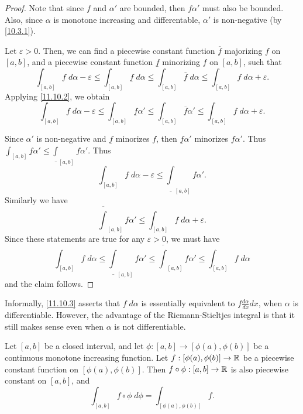 \begin{proof}
  Note that since \(f\) and \(\alpha'\) are bounded, then \(f \alpha'\) must also be bounded.
  Also, since \(\alpha\) is monotone increasing and differentable, \(\alpha'\) is non-negative (by \cref{10.3.1}).

  Let \(\varepsilon > 0\).
  Then, we can find a piecewise constant function \(\overline{f}\) majorizing \(f\) on \([a, b]\), and a piecewise constant function \(\underline{f}\) minorizing \(f\) on \([a, b]\), such that
  \[
    \int_{[a, b]} f \; d \alpha - \varepsilon \leq \int_{[a, b]} \underline{f} \; d \alpha \leq \int_{[a, b]} \overline{f} \; d \alpha \leq \int_{[a, b]} f \; d \alpha + \varepsilon.
  \]
  Applying \cref{11.10.2}, we obtain
  \[
    \int_{[a, b]} f \; d \alpha - \varepsilon \leq \int_{[a, b]} \underline{f} \alpha' \leq \int_{[a, b]} \overline{f} \alpha' \leq \int_{[a, b]} f \; d \alpha + \varepsilon.
  \]

  Since \(\alpha'\) is non-negative and \(\underline{f}\) minorizes \(f\), then \(\underline{f} \alpha'\) minorizes \(f \alpha'\).
  Thus \(\int_{[a, b]} \underline{f} \alpha' \leq \underline{\int}_{[a, b]} f \alpha'\).
  Thus
  \[
    \int_{[a, b]} f \; d \alpha - \varepsilon \leq \underline{\int}_{[a, b]} f \alpha'.
  \]
  Similarly we have
  \[
    \overline{\int}_{[a, b]} f \alpha' \leq \int_{[a, b]} f \; d \alpha + \varepsilon.
  \]
  Since these statements are true for any \(\varepsilon > 0\), we must have
  \[
    \int_{[a, b]} f \; d \alpha \leq \underline{\int}_{[a, b]} f \alpha' \leq \overline{\int}_{[a, b]} f \alpha' \leq \int_{[a, b]} f \; d \alpha
  \]
  and the claim follows.
\end{proof}

\begin{rmk}\label{11.10.4}
  Informally, \cref{11.10.3} asserts that \(f \; d \alpha\) is essentially equivalent to \(f \frac{d \alpha}{dx} dx\), when \(\alpha\) is differentiable.
  However, the advantage of the Riemann-Stieltjes integral is that it still makes sense even when \(\alpha\) is not differentiable.
\end{rmk}

\begin{lem}\label{11.10.5}
  Let \([a, b]\) be a closed interval, and let \(\phi : [a, b] \to [\phi(a), \phi(b)]\) be a continuous monotone increasing function.
  Let \(f : [\phi(a), \phi(b)] \to \mathbb{R}\) be a piecewise constant function on \([\phi(a), \phi(b)]\).
  Then \(f \circ \phi : [a, b] \to \mathbb{R}\) is also piecewise constant on \([a, b]\), and
  \[
    \int_{[a, b]} f \circ \phi \; d \phi = \int_{[\phi(a), \phi(b)]} f.
  \]
\end{lem}

